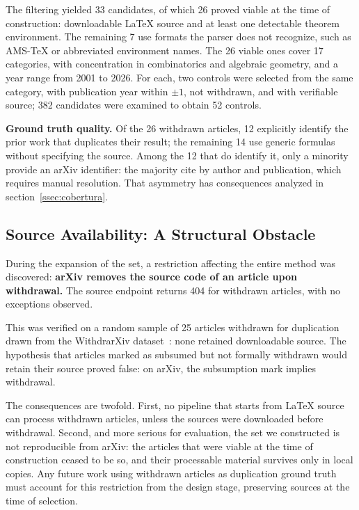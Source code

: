 \documentclass{article}
\theoremstyle{remark}
\begin{document}
The filtering yielded 33 candidates, of which 26 proved viable at the time of construction: downloadable LaTeX source and at least one detectable theorem environment. The remaining 7 use formats the parser does not recognize, such as AMS-\TeX{} or abbreviated environment names. The 26 viable ones cover 17 categories, with concentration in combinatorics and algebraic geometry, and a year range from 2001 to 2026. For each, two controls were selected from the same category, with publication year within $\pm 1$, not withdrawn, and with verifiable source; 382 candidates were examined to obtain 52 controls.

\textbf{Ground truth quality.} Of the 26 withdrawn articles, 12 explicitly identify the prior work that duplicates their result; the remaining 14 use generic formulas without specifying the source. Among the 12 that do identify it, only a minority provide an arXiv identifier: the majority cite by author and publication, which requires manual resolution. That asymmetry has consequences analyzed in section~\ref{ssec:cobertura}.

\subsection{Source Availability: A Structural Obstacle}
\label{ssec:fuentes}

During the expansion of the set, a restriction affecting the entire method was discovered: \textbf{arXiv removes the source code of an article upon withdrawal.} The source endpoint returns 404 for withdrawn articles, with no exceptions observed.

This was verified on a random sample of 25 articles withdrawn for duplication drawn from the WithdrarXiv dataset~\cite{withdrarxiv2024}: none retained downloadable source. The hypothesis that articles marked as subsumed but not formally withdrawn would retain their source proved false: on arXiv, the subsumption mark implies withdrawal.

The consequences are twofold. First, no pipeline that starts from LaTeX source can process withdrawn articles, unless the sources were downloaded before withdrawal. Second, and more serious for evaluation, the set we constructed is not reproducible from arXiv: the articles that were viable at the time of construction ceased to be so, and their processable material survives only in local copies. Any future work using withdrawn articles as duplication ground truth must account for this restriction from the design stage, preserving sources at the time of selection.
\end{document}

